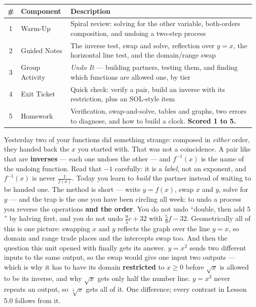 \documentclass[10pt]{article}
\begin{document}
\begin{tocbox}
\small
\renewcommand{\arraystretch}{1.5}
\begin{tabularx}{\linewidth}{@{} c l X @{}}
\rowcolor{forestbg}
\textbf{\#} & \textbf{Component} & \textbf{Description} \\
\midrule
1 & Warm-Up        & Spiral review: solving for the other variable, both-orders composition, and undoing a two-step process \\
2 & Guided Notes   & The inverse test, swap and solve, reflection over $y=x$, the horizontal line test, and the domain/range swap \\
3 & Group Activity & \emph{Undo It} --- building partners, testing them, and finding which functions are allowed one, by tier \\
4 & Exit Ticket    & Quick check: verify a pair, build an inverse with its restriction, plus an SOL-style item \\
5 & Homework       & Verification, swap-and-solve, tables and graphs, two errors to diagnose, and how to build a clock. \textbf{Scored 1 to 5.} \\
\end{tabularx}
\end{tocbox}

\vspace{0.10in}

\begin{remindbox}
\small Yesterday two of your functions did something strange: composed in \emph{either} order, they
handed back the $x$ you started with. That was not a coincidence. A pair like that are
\textbf{inverses} --- each one undoes the other --- and $f^{-1}(x)$ is the name of the undoing
function. Read that $-1$ carefully: it is a \emph{label}, not an exponent, and $f^{-1}(x)$ is never
$\frac{1}{f(x)}$. Today you learn to \emph{build} the partner instead of waiting to be handed one.
The method is short --- write $y=f(x)$, swap $x$ and $y$, solve for $y$ --- and the trap is the one
you have been circling all week: to undo a process you reverse the operations \textbf{and the
order}. You do not undo ``double, then add $5$'' by halving first, and you do not undo
$\frac95c+32$ with $\frac59f-32$. Geometrically all of this is one picture: swapping $x$ and $y$
reflects the graph over the line $y=x$, so domain and range trade places and the intercepts swap
too. And then the question this unit opened with finally gets its answer. $y=x^{2}$ sends two
different inputs to the same output, so the swap would give one input two outputs --- which is why
it has to have its domain \textbf{restricted} to $x\ge0$ before $\sqrt{x}$ is allowed to be its
inverse, and why $\sqrt{x}$ gets only half the number line. $y=x^{3}$ never repeats an output, so
$\sqrt[3]{x}$ gets all of it. One difference; every contrast in Lesson 5.0 follows from it.
\end{remindbox}
\end{document}
